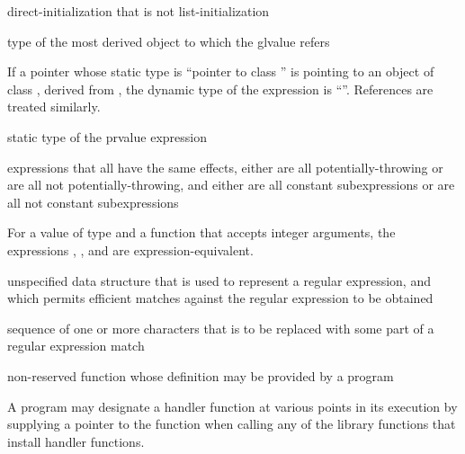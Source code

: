 %
direct-initialization
that is not list-initialization

%
 type of the most derived object to which the
glvalue refers

\begin{example}
If a pointer  whose static type is ``pointer to
class '' is pointing to an object of class , derived
from , the dynamic type of the
expression  is ``''. References are
treated similarly.
\end{example}

%
 static type of the prvalue expression

%
expressions that all have the same effects,
either
are all potentially-throwing or
are all not potentially-throwing,
and
either
are all constant subexpressions or
are all not constant subexpressions

\begin{example}
For a value  of type 
and a function  that accepts integer arguments,
the expressions
,
,
and
are expression-equivalent.
\end{example}

%
unspecified data structure that is used to
represent a regular expression, and which permits efficient matches
against the regular expression to be obtained

%
sequence of one or more characters that is to be
replaced with some part of a regular expression match

%
non-reserved function whose definition may be provided by a \Cpp{} program

\begin{defnote}
A \Cpp{} program may designate a handler function at various points in its execution by
supplying a pointer to the function when calling any of the library functions that install
handler functions.
\end{defnote}

